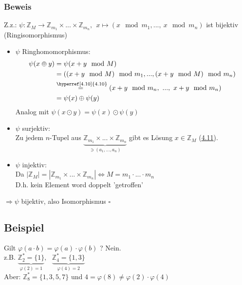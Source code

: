 \documentclass[a4paper, 12pt,titlepage, pdf, headsepline]{scrartcl}
\newcommand{\qed}{\hfill$\square$}
\renewcommand{\>}{\rightarrow}
\renewcommand{\*}{\cdot}
\renewcommand{\phi}{\varphi}
\begin{document}
		      	\subsubsection*{Beweis}
		      	Z.z.: $\psi : \mathds{Z}_M \rightarrow \mathds{Z}_{m_1} \times ... \times \mathds{Z}_{m_n},~~ x \mapsto (x \mod m_1,...,~x \mod m_n)$ ist bijektiv (Ringisomorphismus)
		      	\begin{itemize}
		      		\item $\psi$ Ringhomomorphismus:
		      		      \begin{align*}
		      		      	\psi (x \oplus y) & = \psi(x+y \mod M)                                                              \\
		      		      	                  & = ((x+y \mod M) \mod m_1,..., (x+y \mod M) \mod m_n)                            \\
		      		      	                  & \overset{\textrm{\hyperref[4.10]{4.10}}}{=~} (x+y \mod m_n,~..., ~x+y \mod m_n) \\
		      		      	                  & = \psi(x) \oplus \psi(y)                                                        
		      		      \end{align*}
		      		      Analog mit $\psi(x \odot y) = \psi(x) \odot \psi(y)$
		      		\item $\psi$ surjektiv:\\
		      		      Zu jedem $n$-Tupel aus $\underbrace{\mathds{Z}_{m_1} \times ... \times \mathds{Z}_{m_n}}_{\ni(a_1,...,a_n)}$ gibt es Lösung $x \in \mathds{Z}_M$ (\hyperref[4.11]{4.11}).
		      		\item $\psi$ injektiv: \\
		      		      Da $| \mathds{Z}_M| = | \mathds{Z}_{m_1} \times ... \times \mathds{Z}_{m_n}| \Leftrightarrow M = m_1 \cdot ... \cdot m_n$ \\
		      		      D.h. kein Element word doppelt 'getroffen' \\
		      	\end{itemize}
		      	$\Rightarrow \psi$ bijektiv, also Isomorphismus 
		      	\qed
		      	\subsection{Beispiel}
		      	Gilt $\phi (a \cdot b) = \phi(a) \cdot \phi(b)$ ? Nein.\\
		      	z.B. $\underbrace{\mathds{Z}_2^* = \{1\}}_{\phi(2) = 1},~~~ \underbrace{\mathds{Z}_4^* = \{1,3\}}_{\phi(4)= 2}$\\
		      	Aber: $\mathds{Z}_8^* =\{1,3,5,7\}$ und $4 = \phi(8) \neq \phi(2) \cdot \phi(4)$
\end{document}
